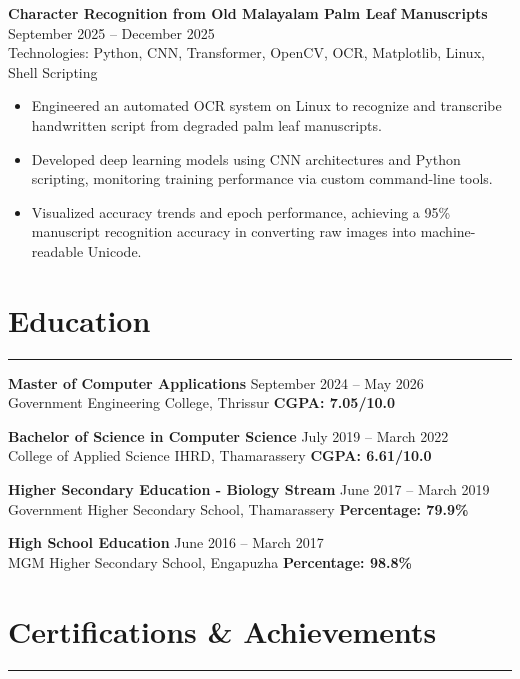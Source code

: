 \documentclass[letterpaper,10pt]{article}
\begin{document}
\textbf{Character Recognition from Old Malayalam Palm Leaf Manuscripts} \hfill September 2025 -- December 2025 \\
Technologies: Python, CNN, Transformer, OpenCV, OCR, Matplotlib, Linux, Shell Scripting
\begin{itemize}
\item Engineered an automated OCR system on Linux to recognize and transcribe handwritten script from degraded palm leaf manuscripts.
\item Developed deep learning models using CNN architectures and Python scripting, monitoring training performance via custom command-line tools.
\item Visualized accuracy trends and epoch performance, achieving a 95\% manuscript recognition accuracy in converting raw images into machine-readable Unicode.
\end{itemize}

\section*{Education}
\hrule
\vspace{4pt}

\textbf{Master of Computer Applications} \hfill September 2024 -- May 2026 \\
Government Engineering College, Thrissur \hfill \textbf{CGPA: 7.05/10.0}

\vspace{4pt}

\textbf{Bachelor of Science in Computer Science} \hfill July 2019 -- March 2022 \\
College of Applied Science IHRD, Thamarassery \hfill \textbf{CGPA: 6.61/10.0}

\vspace{4pt}

\textbf{Higher Secondary Education - Biology Stream} \hfill June 2017 -- March 2019 \\
Government Higher Secondary School, Thamarassery \hfill \textbf{Percentage: 79.9\%}

\vspace{4pt}

\textbf{High School Education} \hfill June 2016 -- March 2017 \\
MGM Higher Secondary School, Engapuzha \hfill \textbf{Percentage: 98.8\%}

\section*{Certifications \& Achievements}
\hrule
\vspace{4pt}
\end{document}
